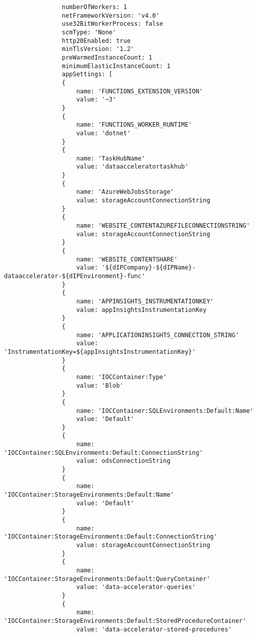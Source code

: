 \documentclass[dutch,dit,thesis]{hogentreport}
\begin{document}
\begin{lstlisting}
                numberOfWorkers: 1
                netFrameworkVersion: 'v4.0'
                use32BitWorkerProcess: false
                scmType: 'None'
                http20Enabled: true
                minTlsVersion: '1.2'
                preWarmedInstanceCount: 1
                minimumElasticInstanceCount: 1
                appSettings: [
                {
                    name: 'FUNCTIONS_EXTENSION_VERSION'
                    value: '~3'
                }
                {
                    name: 'FUNCTIONS_WORKER_RUNTIME'
                    value: 'dotnet'
                }
                {
                    name: 'TaskHubName'
                    value: 'dataacceleratortaskhub'
                }
                {
                    name: 'AzureWebJobsStorage'
                    value: storageAccountConnectionString
                }
                {
                    name: 'WEBSITE_CONTENTAZUREFILECONNECTIONSTRING'
                    value: storageAccountConnectionString
                }
                {
                    name: 'WEBSITE_CONTENTSHARE'
                    value: '${dIPCompany}-${dIPName}-dataaccelerator-${dIPEnvironment}-func'
                }
                {
                    name: 'APPINSIGHTS_INSTRUMENTATIONKEY'
                    value: appInsightsInstrumentationKey
                }
                {
                    name: 'APPLICATIONINSIGHTS_CONNECTION_STRING'
                    value: 'InstrumentationKey=${appInsightsInstrumentationKey}'
                }
                {
                    name: 'IOCContainer:Type'
                    value: 'Blob'
                }
                {
                    name: 'IOCContainer:SQLEnvironments:Default:Name'
                    value: 'Default'
                }
                {
                    name: 'IOCContainer:SQLEnvironments:Default:ConnectionString'
                    value: odsConnectionString
                }
                {
                    name: 'IOCContainer:StorageEnvironments:Default:Name'
                    value: 'Default'
                }
                {
                    name: 'IOCContainer:StorageEnvironments:Default:ConnectionString'
                    value: storageAccountConnectionString
                }
                {
                    name: 'IOCContainer:StorageEnvironments:Default:QueryContainer'
                    value: 'data-accelerator-queries'
                }
                {
                    name: 'IOCContainer:StorageEnvironments:Default:StoredProcedureContainer'
                    value: 'data-accelerator-stored-procedures'

\end{lstlisting}
\end{document}
